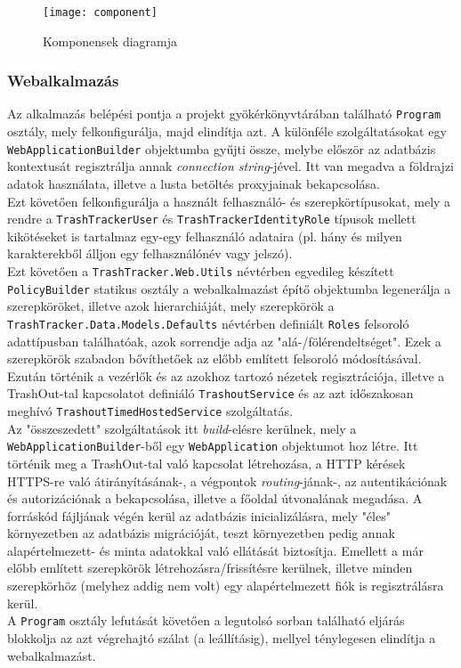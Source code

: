\begin{figure}[H]
	\centering
	\texttt{[image: component]}
	\caption{Komponensek diagramja}
	\label{fig:component}
\end{figure}

\subsubsection{Webalkalmazás}

Az alkalmazás belépési pontja a projekt gyökérkönyvtárában található \texttt{Program} osztály, mely felkonfigurálja, majd elindítja azt. A különféle szolgáltatásokat egy \texttt{WebApplicationBuilder} objektumba gyűjti össze, melybe először az adatbázis kontextusát regisztrálja annak \textit{connection string}-jével. Itt van megadva a földrajzi adatok használata, illetve a lusta betöltés proxyjainak bekapcsolása.\\
Ezt követően felkonfigurálja a használt felhasználó- és szerepkörtípusokat, mely a rendre a \texttt{TrashTrackerUser} és \texttt{TrashTrackerIdentityRole} típusok mellett kikötéseket is tartalmaz egy-egy felhasználó adataira (pl. hány és milyen karakterekből álljon egy felhasználónév vagy jelszó).\\
Ezt követően a \texttt{TrashTracker.Web.Utils} névtérben egyedileg készített \texttt{PolicyBuilder} statikus osztály a webalkalmazást építő objektumba legenerálja a szerepköröket, illetve azok hierarchiáját, mely szerepkörök a \texttt{TrashTracker.Data.Models.Defaults} névtérben definiált \texttt{Roles} felsoroló adattípusban találhatóak, azok sorrendje adja az "alá-/fölérendeltséget". Ezek a szerepkörök szabadon bővíthetőek az előbb említett felsoroló módosításával.\\
Ezután történik a vezérlők és az azokhoz tartozó nézetek regisztrációja, illetve a TrashOut-tal kapcsolatot definiáló \texttt{TrashoutService} és az azt időszakosan meghívó \texttt{TrashoutTimedHostedService} szolgáltatás.\\
Az "összeszedett" szolgáltatások itt \textit{build}-elésre kerülnek, mely a \texttt{WebApplicationBuilder}-ből egy \texttt{WebApplication} objektumot hoz létre. Itt történik meg a TrashOut-tal való kapcsolat létrehozása, a HTTP kérések HTTPS-re való átirányításának-, a végpontok \textit{routing}-jának-, az autentikációnak és autorizációnak a bekapcsolása, illetve a főoldal útvonalának megadása. A forráskód fájljának végén kerül az adatbázis inicializálásra, mely "éles" környezetben az adatbázis migrációját, teszt környezetben pedig annak alapértelmezett- és minta adatokkal való ellátását biztosítja. Emellett a már előbb említett szerepkörök létrehozásra/frissítésre kerülnek, illetve minden szerepkörhöz (melyhez addig nem volt) egy alapértelmezett fiók is regisztrálásra kerül.\\
A \texttt{Program} osztály lefutását követően a legutolsó sorban található eljárás blokkolja az azt végrehajtó szálat (a leállításig), mellyel ténylegesen elindítja a webalkalmazást.

